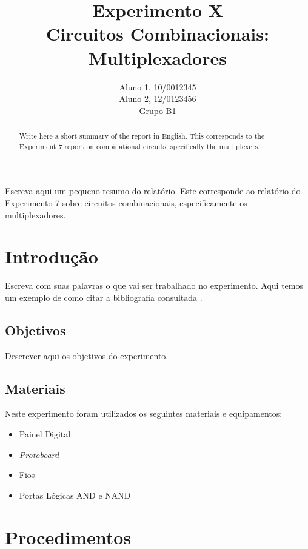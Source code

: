\documentclass[12pt]{article}
\title{Experimento X\\ 
Circuitos Combinacionais: Multiplexadores}
\author{Aluno 1, 10/0012345\\
        Aluno 2,  12/0123456\\
        Grupo B1
}
\begin{document}
 
\maketitle

 \begin{abstract}
   Write here a short summary of the report in English. This corresponds to the Experiment 7 report on combinational circuits, specifically the multiplexers.
 \end{abstract}
    
 \begin{resumo} 
  Escreva aqui um pequeno resumo do relatório. Este corresponde ao relatório do Experimento 7 sobre circuitos combinacionais, especificamente os multiplexadores.
 \end{resumo}


\section{Introdução}
\label{sec:Introducao}

Escreva com suas palavras o que vai ser trabalhado no experimento. Aqui temos um exemplo de como citar a bibliografia consultada \cite{boulic:91} \cite{smith:99}.

\subsection{Objetivos}
\label{sec:Objetivos}

Descrever aqui os objetivos do experimento.

\subsection{Materiais} 
\label{sec:Materiais}
Neste experimento foram utilizados os seguintes materiais e equipamentos:
\begin{itemize}
    \item Painel Digital

    \item \textit{Protoboard}
    
    \item Fios
    
    \item Portas Lógicas AND e NAND
\end{itemize}

\section{Procedimentos}
\label{sec:Procedimentos}
\end{document}
